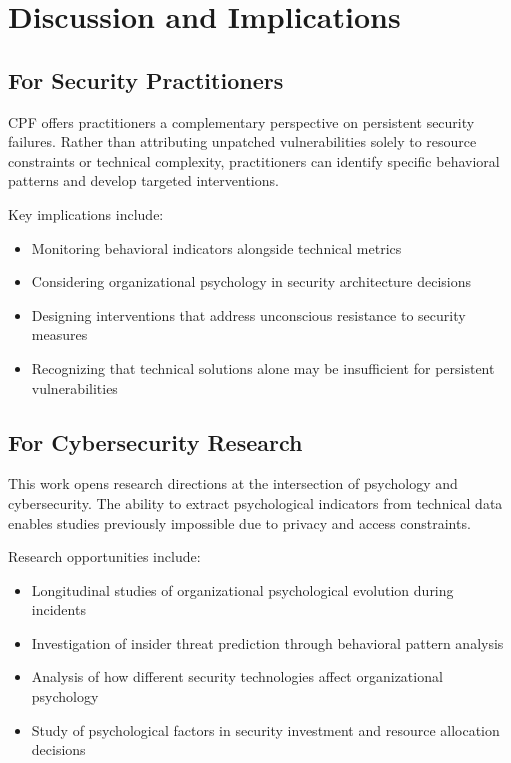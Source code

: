 \documentclass[10pt, twocolumn]{article}
\begin{document}
\section{Discussion and Implications}

\subsection{For Security Practitioners}

CPF offers practitioners a complementary perspective on persistent security failures. Rather than attributing unpatched vulnerabilities solely to resource constraints or technical complexity, practitioners can identify specific behavioral patterns and develop targeted interventions.

Key implications include:
\begin{itemize}
\item Monitoring behavioral indicators alongside technical metrics
\item Considering organizational psychology in security architecture decisions
\item Designing interventions that address unconscious resistance to security measures
\item Recognizing that technical solutions alone may be insufficient for persistent vulnerabilities
\end{itemize}

\subsection{For Cybersecurity Research}

This work opens research directions at the intersection of psychology and cybersecurity. The ability to extract psychological indicators from technical data enables studies previously impossible due to privacy and access constraints.

Research opportunities include:
\begin{itemize}
\item Longitudinal studies of organizational psychological evolution during incidents
\item Investigation of insider threat prediction through behavioral pattern analysis
\item Analysis of how different security technologies affect organizational psychology
\item Study of psychological factors in security investment and resource allocation decisions
\end{itemize}
\end{document}
